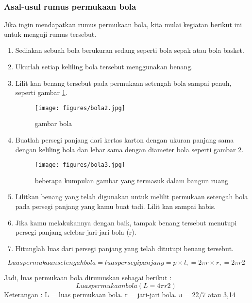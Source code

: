 \subsubsection{Asal-usul rumus permukaan bola}
Jika ingin mendapatkan rumus permukaan bola, kita mulai kegiatan berikut ini untuk menguji rumus tersebut.
\begin{enumerate}
\item Sediakan sebuah bola berukuran sedang seperti bola sepak atau bola basket.
\item Ukurlah setiap keliling bola tersebut menggunakan benang.
\item Lilit kan benang tersebut pada permukaan setengah bola sampai penuh, seperti gambar \ref{bola2}.
\begin{figure}[ht]
    \centerline{\texttt{[image: figures/bola2.jpg]}}
    \caption{gambar bola}
    \label{bola2}
    \end{figure}
\item Buatlah persegi panjang dari kertas karton dengan ukuran panjang sama dengan keliling bola dan lebar sama dengan diameter bola seperti gambar \ref{bola3}.
\begin{figure}[ht]
    \centerline{\texttt{[image: figures/bola3.jpg]}}
    \caption{beberapa kumpulan gambar yang termasuk dalam bangun ruang}
    \label{bola3}
    \end{figure}

\item Lilitkan benang yang telah digunakan untuk melilit permukaan setengah bola pada persegi panjang yang kamu buat tadi. Lilit kan sampai habis.

\item Jika kamu melakukannya dengan baik, tampak benang tersebut menutupi persegi panjang selebar jari-jari bola (r).
\item Hitunglah luas dari persegi panjang yang telah ditutupi benang tersebut. 
\end{enumerate}
\begin{equation}
Luas permukaan setengah bola = luas persegi panjang
                                           = p \times  l,
                                           = 2\pi r \times  r,
                                           = 2\pi r2
\end{equation}

Jadi, luas permukaan bola dirumuskan sebagai berikut :
\begin{equation}
Luas permukaan bola ( L = 4\pi r2 )
\end{equation}
Keterangan :
L = luas permukaan bola.
r = jari-jari bola.
π = 22/7 atau 3,14

